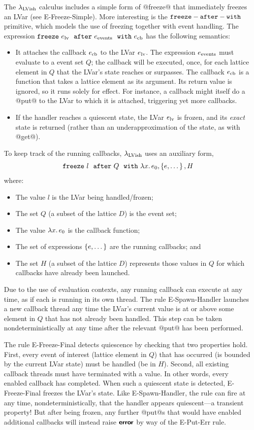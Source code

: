 \documentclass{article}
\begin{document}
The $\lambda_{\textrm{LVish}}$ calculus includes a simple form of @freeze@ that
immediately freezes an LVar (see {\sc E-Freeze-Simple}).  More
interesting is the ${\mbox{\texttt{freeze}}-\mbox{\texttt{after}}-\mbox{\texttt{with}}}$ primitive, which models the use of freezing
together with event handling.  The expression $\mbox{\texttt{freeze}}~e_{\rm
    lv}~~{\mbox{\texttt{after}}}~e_{\rm events}~~{\mbox{\texttt{with}}}~e_{\rm cb}$ has the following semantics:
\begin{itemize}
\item It attaches the callback $e_{\rm cb}$ to the LVar $e_{\rm lv}$.
  The expression $e_{\rm events}$ must evaluate to a event set $Q$;
  the callback will be executed, once, for each lattice element in $Q$
  that the LVar's state reaches or surpasses.  The callback $e_{\rm
    cb}$ is a function that takes a lattice element as its argument.
  Its return value is ignored, so it runs solely for effect.  For
  instance, a callback might itself do a @put@ to the LVar to which it
  is attached, triggering yet more callbacks.
\item If the handler reaches a quiescent state, the LVar $e_{\rm lv}$
  is frozen, and its \emph{exact} state is returned (rather than an
  underapproximation of the state, as with @get@).
\end{itemize}
\noindent
To keep track of the running callbacks, $\lambda_{\textrm{LVish}}$ uses an
auxiliary form,
\[
   \mbox{\texttt{freeze}}~l~~{\mbox{\texttt{after}}}~Q~~{\mbox{\texttt{with}}}~\lambda x.\,e_0, \left\{e, \dots\right\}, H
\]
where:
\begin{itemize}
\item The value $l$ is the LVar being handled/frozen;
\item The set $Q$ (a subset of the lattice $D$) is the event set;
\item The value $\lambda x.\,e_0$ is the callback function;
\item The set of expressions $\left\{e, \dots\right\}$ are the running
  callbacks; and
\item The set $H$ (a subset of the lattice $D$) represents those
  values in $Q$ for which callbacks have already been launched.
\end{itemize}
Due to the use of evaluation contexts, any running callback can
execute at any time, as if each is running in its own thread.  The
rule {\sc E-Spawn-Handler} launches a new callback thread any time the
LVar's current value is at or above some element in $Q$ that has not
already been handled.  This step can be taken nondeterministically at
any time after the relevant @put@ has been performed.

The rule {\sc E-Freeze-Final} detects quiescence by checking that two
properties hold.  First, every event of interest (lattice element in
$Q$) that has occurred (is bounded by the current LVar state) must be
handled (be in $H$).  Second, all existing callback threads must have
terminated with a value.  In other words, every enabled callback has
completed.  When such a quiescent state is detected, {\sc
  E-Freeze-Final} freezes the LVar's state.  Like {\sc
  E-Spawn-Handler}, the rule can fire at any time,
nondeterministically, that the handler appears quiescent---a transient
property!  But after being frozen, any further @put@s that would have
enabled additional callbacks will instead raise $\textbf{\textsf{error}}$ by way of the
{\sc E-Put-Err} rule.
\end{document}
